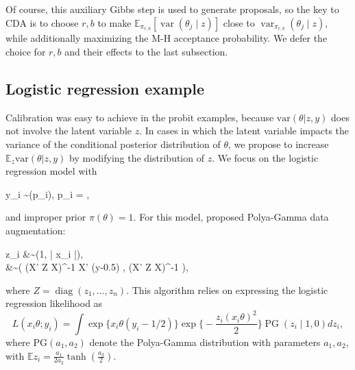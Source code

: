 \documentclass[10pt]{article}
\newcommand{\xtheta}{ x_i \theta}
\newcommand{\be}{\begin{equs}}
\newcommand{\ee}{\end{equs}}
\newcommand{\bb}[1]{\mathbb{#1}}
\DeclareMathOperator{\No}{No}
\DeclareMathOperator{\PG}{PG}
\DeclareMathOperator{\Bern}{Bernoulli}
\DeclareMathOperator{\var}{var}
\DeclareMathOperator{\diag}{diag}
\begin{document}
Of course, this auxiliary Gibbs step is used to generate proposals, so the key to CDA is to choose $r,b$ to make $\bb E_{\pi_{r,b}}[\var(\theta_j \mid z)]$ close to $\var_{\pi_{r,b}}(\theta_j \mid z)$, while additionally maximizing the M-H acceptance probability. We defer the choice for $r,b$ and their effects to the last subsection.



\subsection{Logistic regression example}

Calibration was easy to achieve in the probit examples, because $\mbox{var}( \theta | z,y)$ does not involve the latent variable $z$.  In cases in which the latent variable impacts the variance of the conditional posterior distribution of $\theta$, we propose to increase $\bb E_z \mbox{var}(\theta|z,y)$ by modifying the distribution of $z$. We focus on the logistic regression model with 
\be
y_i \sim \Bern(p_i), \quad p_i = ,
\ee
and improper prior $\pi(\theta)=1$. For this model, \cite{polson2013bayesian} proposed Polya-Gamma data augmentation:
\be
 z_i &\sim {\PG}(1, |\xtheta|),\\
\theta &\sim \No \left(  (X' Z X)^{-1}   X'  (y-0.5)  ,  (X' Z X)^{-1}  \right),
\ee
where $Z= \diag(z_1,\ldots,z_n)$.  This algorithm relies on expressing the logistic regression likelihood as
$$L( \xtheta; y_i )=  \int \exp\{ \xtheta (y_i-1/2)\} \exp\bigg\{ -\frac{z_i (\xtheta)^2}{2}\bigg\} \PG(z_i \mid 1,0) dz_i,$$
where $\mbox{PG}(a_1,a_2)$ denote the Polya-Gamma distribution with parameters $a_1,a_2$, with $\bb{E}z_i= \frac{a_1}{2 a_2}\tanh(\frac{a_2}{2})$.
\end{document}
